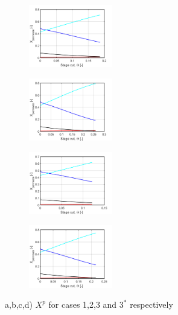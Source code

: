 \begin{figure}[H]
\centering
	\begin{subfigure}[]
		\centering
		\includegraphics[width = 0.4\textwidth]{Images/x_permeate.png}
	\end{subfigure}
	\begin{subfigure}[]
		\centering
		\includegraphics[width = 0.4\textwidth]{Images/x2_permeate.png}
	\end{subfigure}
	\begin{subfigure}[]
		\centering
		\includegraphics[width = 0.4\textwidth]{Images/x3_permeate.png}
	\end{subfigure}
	\begin{subfigure}[]
		\centering
		\includegraphics[width = 0.4\textwidth]{Images/x3star_permeate.png}
	\end{subfigure}	
\caption{a,b,c,d) $X^p$ for cases 1,2,3 and $3^*$ respectively }	
\label{fig:fig2}
\end{figure}

